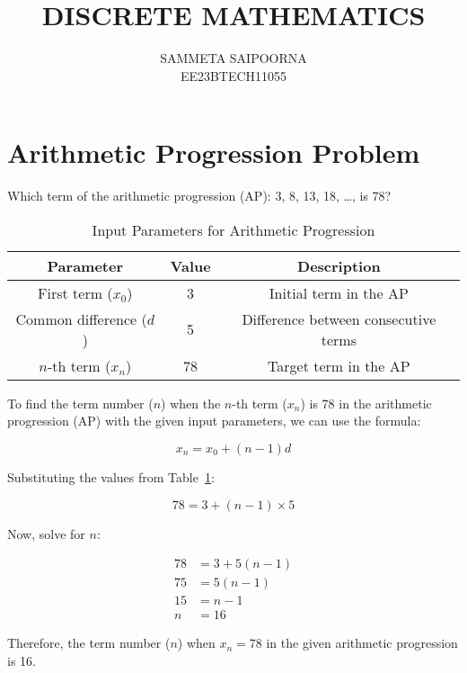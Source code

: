 \documentclass{article}
\title{DISCRETE MATHEMATICS}
\author{SAMMETA SAIPOORNA\\
               EE23BTECH11055}
\begin{document}
\maketitle

\section{Arithmetic Progression Problem}
Which term of the arithmetic progression (AP): 3, 8, 13, 18, \ldots, is 78?

\begin{table}[h]
    \centering
    \begin{tabular}{|c|c|c|}
        \hline
        \textbf{Parameter} & \textbf{Value} & \textbf{Description} \\
        \hline
        First term (\( x_0 \)) & 3 & Initial term in the AP \\
        Common difference (\( d \)) & 5 & Difference between consecutive terms \\
        \(n\)-th term (\( x_n \)) & 78 & Target term in the AP \\
        \hline
    \end{tabular}
    \caption{Input Parameters for Arithmetic Progression}
    \label{tab:input_parameters}
\end{table}

To find the term number (\( n \)) when the \(n\)-th term (\( x_n \)) is 78 in the arithmetic progression (AP) with the given input parameters, we can use the formula:

\[ x_n = x_0 + (n-1)d \]

Substituting the values from Table~\ref{tab:input_parameters}:

\[ 78 = 3 + (n-1) \times 5 \]

Now, solve for \( n \):

\begin{align*}
78 &= 3 + 5(n-1) \label{eq:ap_equation} \\
75 &= 5(n-1) \\
15 &= n-1 \\
n &= 16
\end{align*}

Therefore, the term number (\( n \)) when \( x_n = 78 \) in the given arithmetic progression is 16.
\end{document}
